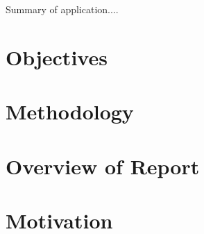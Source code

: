 Summary of application....

\section{Objectives}

\section{Methodology}

\section{Overview of Report}

\section{Motivation}